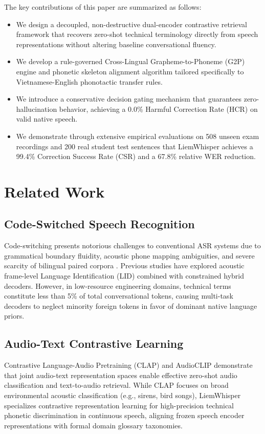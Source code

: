 \documentclass[11pt,conference,onecolumn]{IEEEtran}
\begin{document}
The key contributions of this paper are summarized as follows:
\begin{itemize}
    \item We design a decoupled, non-destructive dual-encoder contrastive retrieval framework that recovers zero-shot technical terminology directly from speech representations without altering baseline conversational fluency.
    \item We develop a rule-governed Cross-Lingual Grapheme-to-Phoneme (G2P) engine and phonetic skeleton alignment algorithm tailored specifically to Vietnamese-English phonotactic transfer rules.
    \item We introduce a conservative decision gating mechanism that guarantees zero-hallucination behavior, achieving a 0.0\% Harmful Correction Rate (HCR) on valid native speech.
    \item We demonstrate through extensive empirical evaluations on 508 unseen exam recordings and 200 real student test sentences that LiemWhisper achieves a 99.4\% Correction Success Rate (CSR) and a 67.8\% relative WER reduction.
\end{itemize}

\section{Related Work}

\subsection{Code-Switched Speech Recognition}
Code-switching presents notorious challenges to conventional ASR systems due to grammatical boundary fluidity, acoustic phone mapping ambiguities, and severe scarcity of bilingual paired corpora \cite{phan2023phowhisper, radford2023robust}. Previous studies have explored acoustic frame-level Language Identification (LID) combined with constrained hybrid decoders. However, in low-resource engineering domains, technical terms constitute less than 5\% of total conversational tokens, causing multi-task decoders to neglect minority foreign tokens in favor of dominant native language priors.

\subsection{Audio-Text Contrastive Learning}
Contrastive Language-Audio Pretraining (CLAP) \cite{elizalde2023clap} and AudioCLIP demonstrate that joint audio-text representation spaces enable effective zero-shot audio classification and text-to-audio retrieval. While CLAP focuses on broad environmental acoustic classification (e.g., sirens, bird songs), LiemWhisper specializes contrastive representation learning for high-precision technical phonetic discrimination in continuous speech, aligning frozen speech encoder representations with formal domain glossary taxonomies.
\end{document}
